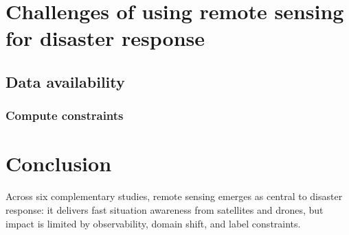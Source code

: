 \documentclass[conference,a4paper]{IEEEtran}
\begin{document}

\section{Challenges of using remote sensing for disaster response}

\subsection{Data availability}


\subsubsection{Compute constraints}


\section{Conclusion}
Across six complementary studies, remote sensing emerges as central to disaster response: it delivers fast situation awareness from satellites and drones, but impact is limited by observability, domain shift, and label constraints.
\end{document}
